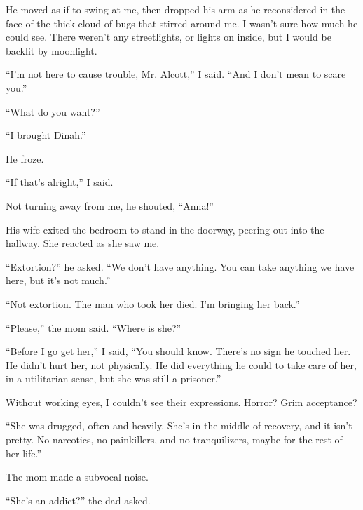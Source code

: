 He moved as if to swing at me, then dropped his arm as he reconsidered in the face of the thick cloud of bugs that stirred around me.  I wasn't sure how much he could see.  There weren't any streetlights, or lights on inside, but I would be backlit by moonlight.



``I'm not here to cause trouble, Mr. Alcott,'' I said.  ``And I don't mean to scare you.''



``What do you want?''



``I brought Dinah.''



He froze.



``If that's alright,'' I said.



Not turning away from me, he shouted, ``Anna!''



His wife exited the bedroom to stand in the doorway, peering out into the hallway.  She reacted as she saw me.



``Extortion?'' he asked.  ``We don't have anything.  You can take anything we have here, but it's not much.''



``Not extortion.  The man who took her died.  I'm bringing her back.''



``Please,'' the mom said.  ``Where is she?''



``Before I go get her,'' I said, ``You should know.  There's no sign he touched her.  He didn't hurt her, not physically.  He did everything he could to take care of her, in a utilitarian sense, but she was still a prisoner.''



Without working eyes, I couldn't see their expressions.  Horror?  Grim acceptance?



``She was drugged, often and heavily.  She's in the middle of recovery, and it isn't pretty.  No narcotics, no painkillers, and no tranquilizers, maybe for the rest of her life.''



The mom made a subvocal noise.



``She's an addict?'' the dad asked.



